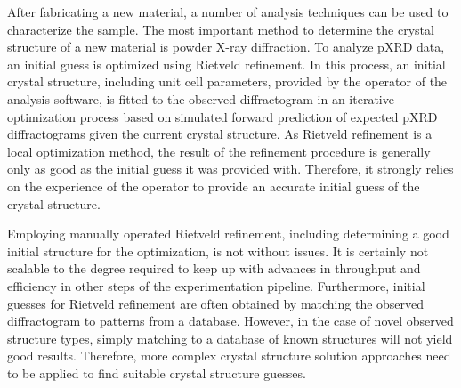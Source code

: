 After fabricating a new material, a number of analysis techniques can be used to characterize the sample.
The most important method to determine the crystal structure of a new material is powder X-ray diffraction. 
To analyze pXRD data, an initial guess is optimized using Rietveld refinement. In this process, an initial crystal structure, including unit cell parameters, provided by the operator of the analysis software, is fitted to the observed diffractogram in an iterative optimization process based on simulated forward prediction of expected pXRD diffractograms given the current crystal structure.
As Rietveld refinement is a local optimization method, the result of the refinement procedure is generally only as good as the initial guess it was provided with.
Therefore, it strongly relies on the experience of the operator to provide an accurate initial guess of the crystal structure.

Employing manually operated Rietveld refinement, including determining a good initial structure for the optimization, is not without issues.
It is certainly not scalable to the degree required to keep up with advances in throughput and efficiency in other steps of the experimentation pipeline.
Furthermore, initial guesses for Rietveld refinement are often obtained by matching the observed diffractogram to patterns from a database.
However, in the case of novel observed structure types, simply matching to a database of known structures will not yield good results. Therefore, more complex crystal structure solution approaches need to be applied to find suitable crystal structure guesses.

